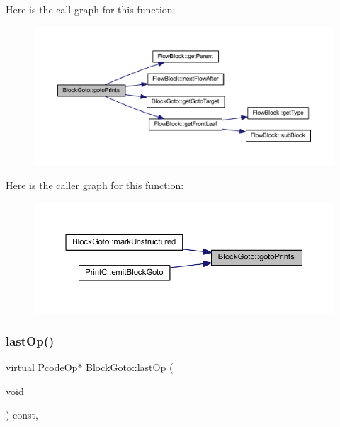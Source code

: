 Here is the call graph for this function\+:
\nopagebreak
\begin{figure}[H]
\begin{center}
\leavevmode
\includegraphics[width=350pt]{class_block_goto_a2c4cc4dddc9aac456e0b439dc7a2ad1f_cgraph}
\end{center}
\end{figure}
Here is the caller graph for this function\+:
\nopagebreak
\begin{figure}[H]
\begin{center}
\leavevmode
\includegraphics[width=350pt]{class_block_goto_a2c4cc4dddc9aac456e0b439dc7a2ad1f_icgraph}
\end{center}
\end{figure}
\mbox{\label{class_block_goto_a1989016995f57acf0da08f1318a75d43}} 
\subsubsection{\texorpdfstring{lastOp()}{lastOp()}}
{\footnotesize\ttfamily virtual \mbox{\hyperlink{class_pcode_op}{Pcode\+Op}}$\ast$ Block\+Goto\+::last\+Op (\begin{DoxyParamCaption}\item[{void}]{ }\end{DoxyParamCaption}) const\hspace{0.3cm}{\ttfamily [inline]}, {\ttfamily [virtual]}}



